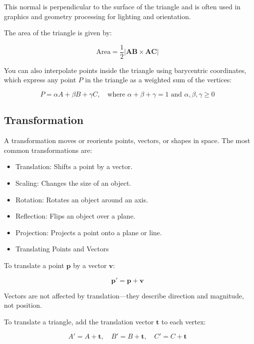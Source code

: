 This normal is perpendicular to the surface of the triangle and is often used in graphics and geometry processing for lighting and orientation.

The area of the triangle is given by:

\begin{equation}
    \text{Area} = \frac{1}{2} |\mathbf{AB} \times \mathbf{AC}|
\end{equation}

You can also interpolate points inside the triangle using barycentric coordinates, which express any point $P$ in the triangle as a weighted sum of the vertices:

\begin{equation}
    P = \alpha A + \beta B + \gamma C, \quad \text{where } \alpha + \beta + \gamma = 1 \text{ and } \alpha, \beta, \gamma \ge 0
\end{equation}

\subsection{Transformation}

A transformation moves or reorients points, vectors, or shapes in space. The most common transformations are:

\begin{itemize}
    \item Translation: Shifts a point by a vector.
    \item Scaling: Changes the size of an object.
    \item Rotation: Rotates an object around an axis.
    \item Reflection: Flips an object over a plane.
    \item Projection: Projects a point onto a plane or line.
    \item Translating Points and Vectors
\end{itemize}

To translate a point $\mathbf{p}$ by a vector $\mathbf{v}$:

\begin{equation}
    \mathbf{p}' = \mathbf{p} + \mathbf{v}
\end{equation}

Vectors are not affected by translation—they describe direction and magnitude, not position.

To translate a triangle, add the translation vector $\mathbf{t}$ to each vertex:

\begin{equation}
    A' = A + \mathbf{t}, \quad B' = B + \mathbf{t}, \quad C' = C + \mathbf{t}
\end{equation}

